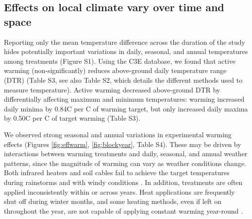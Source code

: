 \documentclass{article}
\begin{document}
\subsection* {Effects on local climate vary over time and space}
Reporting only the mean temperature difference across the duration of the study hides potentially important variations in daily, seasonal, and annual temperatures among treatments (Figure S1). Using the C3E database, we found that active warming (non-significantly) reduces above-ground daily temperature range (DTR) (Table S3, see also Table S2, which details the different methods used to measure temperature). Active warming decreased above-ground DTR by differentially affecting maximum and minimum temperatures: warming increased daily minima by 0.84\degree C per \degree C of warming target, but only increased daily maxima by 0.50\degree C per \degree C of target warming (Table S3). %
\par We observed strong seasonal and annual variations in experimental warming effects (Figures \ref{fig:effwarm}, \ref{fig:blockyear}, Table S4). These may be driven by interactions between warming treatments and daily, seasonal, and annual weather patterns, since the magnitude of warming can vary as weather conditions change.  Both infrared heaters and soil cables fail to achieve the target temperatures during rainstorms \citep{peterjohn1993,hoeppner2012} and with windy conditions \citep{kimball2005,kimball2008}. In addition, treatments are often applied inconsistently within or across years. Heat applications are frequently shut off during winter months, and some heating methods, even if left on throughout the year, are not capable of applying constant warming year-round \citep[e.g.][]{clark2014a,clark2014b,hagedorn2010}. 
\end{document}

